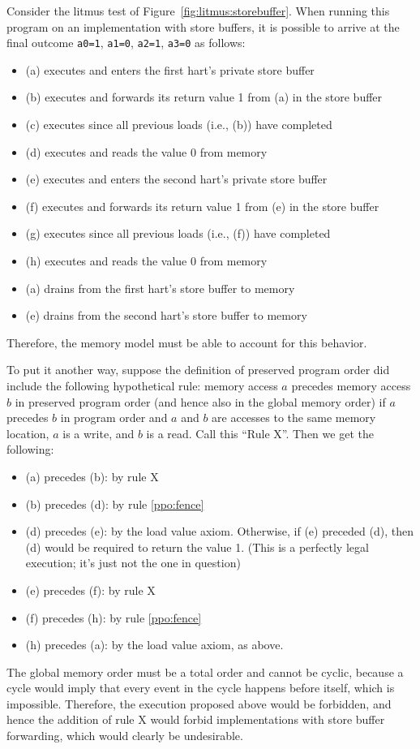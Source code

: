 Consider the litmus test of Figure~\ref{fig:litmus:storebuffer}.
When running this program on an implementation with store buffers, it is possible to arrive at the final outcome
{\tt a0=1}, {\tt a1=0}, {\tt a2=1}, {\tt a3=0}
as follows:
\begin{itemize}
  \item (a) executes and enters the first hart's private store buffer
  \item (b) executes and forwards its return value 1 from (a) in the store buffer
  \item (c) executes since all previous loads (i.e., (b)) have completed
  \item (d) executes and reads the value 0 from memory
  \item (e) executes and enters the second hart's private store buffer
  \item (f) executes and forwards its return value 1 from (e) in the store buffer
  \item (g) executes since all previous loads (i.e., (f)) have completed
  \item (h) executes and reads the value 0 from memory
  \item (a) drains from the first hart's store buffer to memory
  \item (e) drains from the second hart's store buffer to memory
\end{itemize}
Therefore, the memory model must be able to account for this behavior.

To put it another way, suppose the definition of preserved program order did include the following hypothetical rule:
memory access $a$ precedes memory access $b$ in preserved program order (and hence also in the global memory order) if $a$ precedes $b$ in program order and $a$ and $b$ are accesses to the same memory location, $a$ is a write, and $b$ is a read.  Call this ``Rule X''.  Then we get the following:

\begin{itemize}
  \item (a) precedes (b): by rule X
  \item (b) precedes (d): by rule \ref{ppo:fence}
  \item (d) precedes (e): by the load value axiom.  Otherwise, if (e) preceded (d), then (d) would be required to return the value 1.  (This is a perfectly legal execution; it's just not the one in question)
  \item (e) precedes (f): by rule X
  \item (f) precedes (h): by rule \ref{ppo:fence}
  \item (h) precedes (a): by the load value axiom, as above.
\end{itemize}
The global memory order must be a total order and cannot be cyclic, because a cycle would imply that every event in the cycle happens before itself, which is impossible.
Therefore, the execution proposed above would be forbidden, and hence the addition of rule X would forbid implementations with store buffer forwarding, which would clearly be undesirable.

